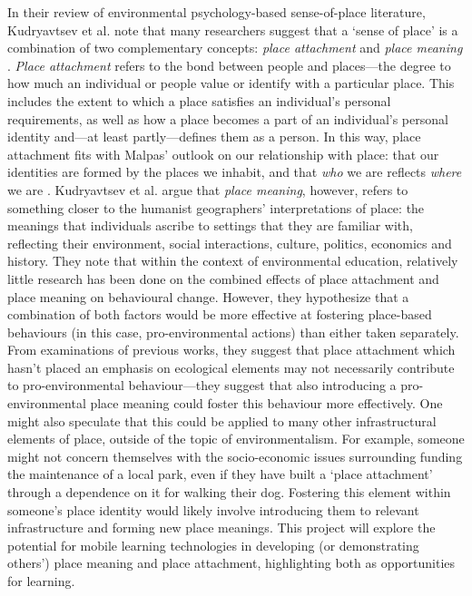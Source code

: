 In their review of environmental psychology-based sense-of-place literature, Kudryavtsev et al. note that many researchers suggest that a `sense of place' is a combination of two complementary concepts: \textit{place attachment} and \textit{place meaning} \citep{Kudryavtsev2012}. \textit{Place attachment} refers to the bond between people and places---the degree to how much an individual or people value or identify with a particular place. This includes the extent to which a place satisfies an individual's personal requirements, as well as how a place becomes a part of an individual's personal identity and---at least partly---defines them as a person. In this way, place attachment fits with Malpas' outlook on our relationship with place: that our identities are formed by the places we inhabit, and that \textit{who} we are reflects \textit{where} we are \citep{malpas1999}. Kudryavtsev et al. argue that \textit{place meaning}, however, refers to something closer to the humanist geographers' interpretations of place: the meanings that individuals ascribe to settings that they are familiar with, reflecting their environment, social interactions, culture, politics, economics and history. They note that within the context of environmental education, relatively little research has been done on the combined effects of place attachment and place meaning on behavioural change. However, they hypothesize that a combination of both factors would be more effective at fostering place-based behaviours (in this case, pro-environmental actions) than either taken separately. From examinations of previous works, they suggest that place attachment which hasn't placed an emphasis on ecological elements may not necessarily contribute to pro-environmental behaviour---they suggest that also introducing a pro-environmental place meaning could foster this behaviour more effectively. One might also speculate that this could be applied to many other infrastructural elements of place, outside of the topic of environmentalism. For example, someone might not concern themselves with the socio-economic issues surrounding funding the maintenance of a local park, even if they have built a `place attachment' through a dependence on it for walking their dog. Fostering this element within someone's place identity would likely involve introducing them to relevant infrastructure and forming new place meanings. This project will explore the potential for mobile learning technologies in developing (or demonstrating others') place meaning and place attachment, highlighting both as opportunities for learning.  


